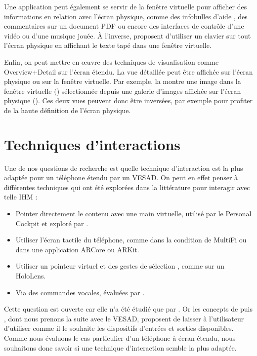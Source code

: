 Une application peut également se servir de la fenêtre virtuelle pour afficher des informations en relation avec l'écran physique, comme des infobulles d'aide , des commentaires sur un document PDF ou encore des interfaces de contrôle d'une vidéo ou d'une musique jouée. À l'inverse, \cite{Grubert2015} proposent d'utiliser un clavier sur tout l'écran physique en affichant le texte tapé dans une fenêtre virtuelle.

Enfin, on peut mettre en œuvre des techniques de visualisation comme Overview+Detail sur l'écran étendu. La vue détaillée peut être affichée sur l'écran physique ou sur la fenêtre virtuelle. Par exemple, la  montre une image dans la fenêtre virtuelle () sélectionnée depuis une galerie d'images affichée sur l'écran physique (). Ces deux vues peuvent donc être inversées, par exemple pour profiter de la haute définition de l'écran physique.


\section{Techniques d'interactions}
\label{sec:concept_interaction_techniques}

Une de nos questions de recherche  est quelle technique d'interaction est la plus adaptée pour un téléphone étendu par un VESAD. On peut en effet penser à différentes techniques qui ont été explorées dans la littérature pour interagir avec telle IHM :

\begin{itemize}
  \item Pointer directement le contenu avec une main virtuelle, utilisé par le Personal Cockpit \citep{Ens2014} et exploré par \cite{Piumsomboon2013}.
  \item Utiliser l'écran tactile du téléphone, comme dans la condition  de MultiFi \citep{Grubert2015} ou dans une application ARCore ou ARKit.
  \item Utiliser un pointeur virtuel et des gestes de sélection \citep{Wilson2006}, comme sur un HoloLens.
  \item Via des commandes vocales, évaluées par \cite{Piumsomboon2014}.
\end{itemize}
\medskip

Cette question est ouverte car elle n'a été étudié que par \cite{Grubert2015}. Or les concepts de \cite{Serrano2015} puis \cite{Serrano2015a}, dont nous prenons la suite avec le VESAD, proposent de laisser à l'utilisateur d'utiliser comme il le souhaite les dispositifs d'entrées et sorties disponibles. Comme nous évaluons le cas particulier d'un téléphone à écran étendu, nous souhaitons donc savoir si une technique d'interaction semble la plus adaptée.

